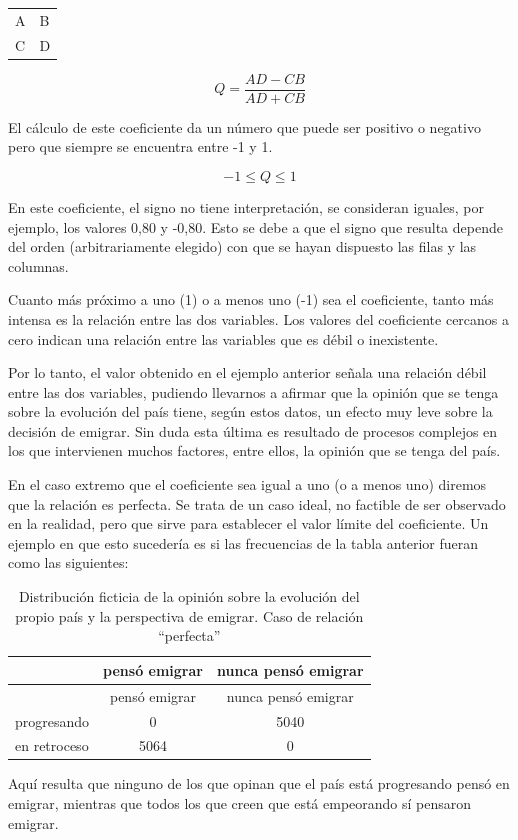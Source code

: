 \documentclass[]{book}
\begin{document}
\begin{longtable}[]{@{}ll@{}}
\toprule
\endhead
A & B\tabularnewline
C & D\tabularnewline
\bottomrule
\end{longtable}

\[Q = \frac{AD - CB}{AD + CB}\]

El cálculo de este coeficiente da un número que puede ser positivo o
negativo pero que siempre se encuentra entre -1 y 1.

\[- 1 \leq Q \leq 1\]

En este coeficiente, el signo no tiene interpretación, se consideran
iguales, por ejemplo, los valores 0,80 y -0,80. Esto se debe a que el
signo que resulta depende del orden (arbitrariamente elegido) con que se hayan dispuesto las filas y las columnas.

Cuanto más próximo a uno (1) o a menos uno (-1) sea el coeficiente,
tanto más intensa es la relación entre las dos variables. Los valores
del coeficiente cercanos a cero indican una relación entre las variables que es débil o inexistente.

Por lo tanto, el valor obtenido en el ejemplo anterior señala una
relación débil entre las dos variables, pudiendo llevarnos a afirmar
que la opinión que se tenga sobre la evolución del país tiene, según estos datos, un efecto muy leve sobre la decisión de emigrar. Sin duda esta última es resultado de procesos complejos en los que intervienen muchos factores, entre ellos, la opinión que se tenga del país.

En el caso extremo que el coeficiente sea igual a uno (o a menos uno)
diremos que la relación es perfecta. Se trata de un caso ideal, no factible de ser observado en la realidad, pero que sirve para establecer el valor límite del coeficiente. Un ejemplo en que esto sucedería es si las frecuencias de la tabla anterior fueran como las siguientes:

\begin{longtable}[]{@{}lcc@{}}
\caption{\label{tab:unnamed-chunk-138}Distribución ficticia de la opinión sobre la evolución del propio país y la perspectiva de emigrar. Caso de relación ``perfecta''}\tabularnewline
\toprule
& pensó emigrar & nunca pensó emigrar\tabularnewline
\midrule
\endfirsthead
\toprule
& pensó emigrar & nunca pensó emigrar\tabularnewline
\midrule
\endhead
progresando & 0 & 5040\tabularnewline
en retroceso & 5064 & 0\tabularnewline
\bottomrule
\end{longtable}

Aquí resulta que ninguno de los que opinan que el país está progresando pensó en emigrar, mientras que todos los que creen que está empeorando sí pensaron emigrar.
\end{document}
